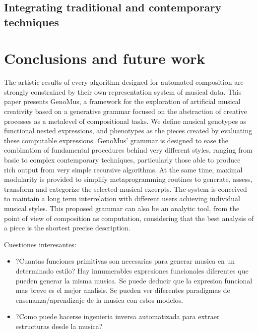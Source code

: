\documentclass{article}
\begin{document}
\subsection{Integrating traditional and contemporary techniques}


\section{Conclusions and future work}

The artistic results of every algorithm designed for automated composition
are strongly constrained by their own representation
system of musical data. This paper presents GenoMus, a
framework for the exploration of artificial musical creativity
based on a generative grammar focused on the abstraction
of creative processes as a metalevel of compositional
tasks. We define musical genotypes as functional
nested expressions, and phenotypes as the pieces created
by evaluating these computable expressions. GenoMus' grammar is designed 
to ease the combination of fundamental procedures behind very different styles, ranging from basic to complex contemporary
techniques, particularly those able to produce rich
output from very simple recursive algorithms. At the same
time, maximal modularity is provided to simplify metaprogramming
routines to generate, assess, transform and categorize
the selected musical excerpts. The system is conceived
to maintain a long term interrelation with different
users achieving individual musical styles. This proposed
grammar can also be an analytic tool, from the point of
view of composition as computation, considering that the
best analysis of a piece is the shortest precise description.

Cuestiones interesantes: 
\begin{itemize}
\item ?Cuantas funciones primitivas son necesarias para generar musica en un determinado estilo? Hay innumerables expresiones funcionales diferentes que pueden generar la misma musica. Se puede deducir que la expresion funcional mas breve es el mejor analisis. Se pueden ver diferentes paradigmas de ensenanza/aprendizaje de la musica con estos modelos.
\item ?Como puede hacerse ingenieria inversa automatizada para extraer estructuras desde la musica?
\end{itemize}
\end{document}
